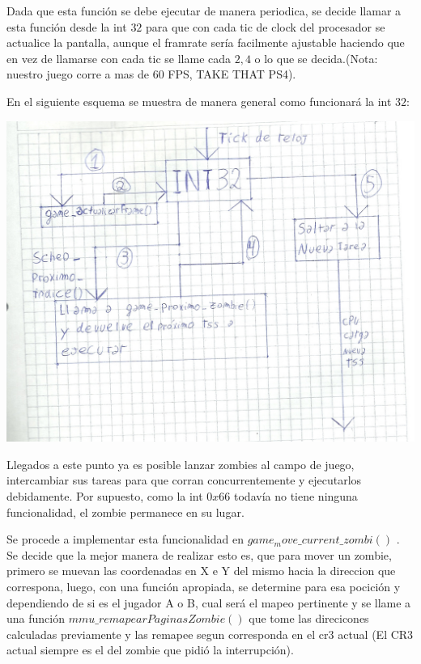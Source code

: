 \documentclass[a4paper]{article}
\begin{document}
Dada que esta función se debe ejecutar de manera periodica, se decide llamar a esta función desde la int $32$ para que con cada tic de clock del procesador se actualice la pantalla, aunque el framrate sería facilmente ajustable haciendo que en vez de llamarse con cada tic se llame cada $2, 4$ o lo que se decida.(Nota: nuestro juego corre a mas de 60 FPS, TAKE THAT PS4).

En el siguiente esquema se muestra de manera general como funcionará la int $32$:


\includegraphics[scale=0.5]{dibujos/dibujo2.jpg}\\
\newpage


Llegados a este punto ya es posible lanzar zombies al campo de juego, intercambiar sus tareas para que corran concurrentemente y ejecutarlos debidamente. Por supuesto, como la int $0x66$ todavía no tiene ninguna funcionalidad, el zombie permanece en su lugar.

Se procede a implementar esta funcionalidad en $game_move\_current\_zombi()$ . Se decide que la mejor manera de realizar esto es, que para mover un zombie, primero se muevan las coordenadas en X e Y del mismo hacia la direccion que correspona, luego, con una función apropiada, se determine para esa pocición y dependiendo de si es el jugador A o B, cual será el mapeo pertinente y se llame a una función $mmu\_remapearPaginasZombie()$ que tome las direcicones calculadas previamente y las remapee segun corresponda en el cr3 actual (El CR3 actual siempre es el del zombie que pidió la interrupción).
\end{document}
